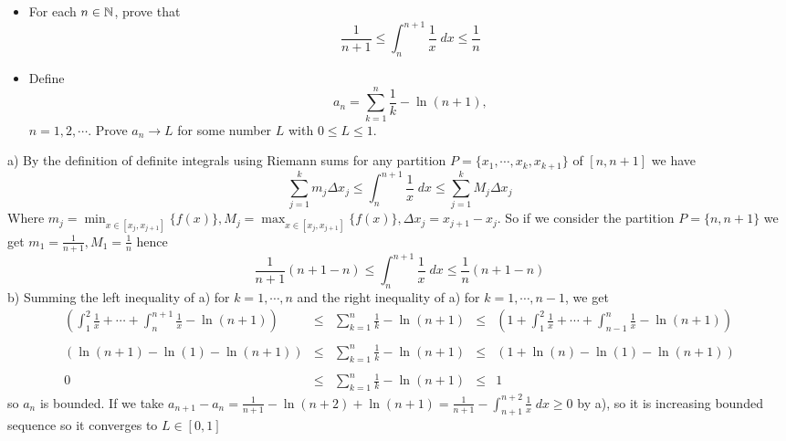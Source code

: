 \begin{problem}
\begin{itemize}
    \item [(a)] For each $n\in \mathbb{N}$, prove that 
    \[\frac{1}{n+1} \leq \int_n^{n+1} \frac1x \; dx \leq \frac{1}{n}\]
    \item[(b)] Define 
    \[a_n = \sum_{k=1}^n \frac1k - \ln(n+1),\]
    $n=1,2,\cdots $. Prove $a_n \to L$ for some number $L$ with $0\leq L \leq 1$. 
\end{itemize}
\begin{solution}
a) By the definition of definite integrals using Riemann sums for any partition $P=\{x_1,\cdots ,x_k,x_{k+1}\}$ of $[n,n+1]$ we have 
    \[\sum_{j=1}^{k} m_j \Delta x_j \leq \int_n^{n+1} \frac1x \; dx \leq \sum_{j=1}^k M_j \Delta x_j\]
    Where $\displaystyle m_j = \min_{x\in[x_j,x_{j+1}] }\{f(x)\}, M_j = \max_{x\in [x_j,x_{j+1}]} \{f(x)\}, \Delta x_j = x_{j+1}-x_j$. So if we consider the partition $P=\{n,n+1\}$ we get $m_1 = \frac{1}{n+1}, M_1 = \frac{1}{n}$ hence 
    \[\frac{1}{n+1} ( n+1-n) \leq \int_n^{n+1} \frac1x \; dx \leq \frac{1}{n} (n+1-n)\]
    b) Summing the left inequality of a) for $k=1,\cdots,n$ and the right inequality of a) for $k=1,\cdots,n-1$, we get
    \[\begin{array}{rcccl}
    \displaystyle \left(\int_1^2 \frac1x +\cdots +\int_{n}^{n+1}\frac1x - \ln(n+1)\right)
    &\leq&\displaystyle
    \sum_{k=1}^n \frac1k - \ln(n+1) &\leq&\displaystyle \left(1 +\int_1^2 \frac1x +\cdots + \int_{n-1}^{n}\frac1x - \ln(n+1)\right) \\ \\
     \displaystyle \left(\ln(n+1)-\ln(1) - \ln(n+1)\right)
    &\leq&\displaystyle
    \sum_{k=1}^n \frac1k - \ln(n+1) &\leq&\displaystyle \left(1 +\ln(n)-\ln(1) - \ln(n+1)\right) \\ \\
    0 &\leq& \displaystyle  \sum_{k=1}^n \frac1k - \ln(n+1) &\leq& 1
    \end{array}\]
    so $a_n$ is bounded. If we take $a_{n+1}-a_n = \frac{1}{n+1} -\ln (n+2) + \ln(n+1) = \frac{1}{n+1}-\int_{n+1}^{n+2}\frac1x\; dx \geq 0$ by a), so it is increasing bounded sequence so it converges to $L\in [0,1]$
\end{solution}
\end{problem}
